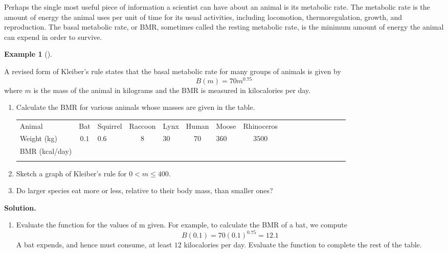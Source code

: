 \documentclass[10pt,]{book}
\theoremstyle{plain}
\theoremstyle{definition}
\theoremstyle{definition}
\theoremstyle{definition}
\newtheorem{example}[theorem]{Example}
\theoremstyle{definition}
\theoremstyle{definition}
\numberwithin{equation}{section}
\newcommand{\hrulethin}  {\noalign{\hrule height 0.04em}}
\newcommand{\hrulethick} {\noalign{\hrule height 0.11em}}
\newcommand{\lt}{ < }
\begin{document}
    Perhaps the single most useful piece of information a scientist can have about an animal is its metabolic rate. The metabolic rate is the amount of energy the animal uses per unit of time for its usual activities, including locomotion, thermoregulation, growth, and reproduction. The basal metabolic rate, or BMR, sometimes called the resting metabolic rate, is the minimum amount of energy the animal can expend in order to survive.
%
\begin{example}[]\label{example-Kleiber-rule}

    A revised form of Kleiber's rule states that the basal metabolic rate for many groups of animals is given by 
    \begin{equation*}B(m) = 70m^{0.75}\end{equation*}
    where \(m\) is the mass of the animal in kilograms and the BMR is measured in kilocalories per day.
%
\leavevmode%
\begin{enumerate}[label=*\alph**]
\item\hypertarget{li-527}{}Calculate the BMR for various animals whose masses are given in the table.
\leavevmode%
\begin{table}
\centering
\begin{tabular}{AcAcAcAcAcAcAcAcA}\hrulethick
Animal&Bat&Squirrel&Raccoon&Lynx&Human&Moose&Rhinoceros\tabularnewline\hrulethin
Weight (kg)&\(0.1\)&\(0.6\)&\(8\)&\(30\)&\(70\)&\(360\)&\(3500\)\tabularnewline\hrulethin
BMR (kcal/day)&\(\)&\(\)&\(\)&\(\)&\(\)&\(\)&\(\)\tabularnewline\hrulethin
\end{tabular}
\end{table}
\item\hypertarget{li-528}{}Sketch a graph of Kleiber’s rule for \(0 \lt m \le 400\).\item\hypertarget{li-529}{}Do larger species eat more or less, relative to their body mass, than smaller ones?\end{enumerate}
\par\medskip\noindent%
\textbf{Solution.}\quad \leavevmode%
\begin{enumerate}[label=*\alph**]
\item\hypertarget{li-530}{}Evaluate the function for the values of m given. For example, to calculate the BMR of a bat, we compute
    \begin{equation*}B(0.1) = 70(0.1)^{0.75} = 12.1\end{equation*}
    A bat expends, and hence must consume, at least \(12\) kilocalories per day. Evaluate the function to complete the rest of the table.

\end{enumerate}
\end{example}
\end{document}

